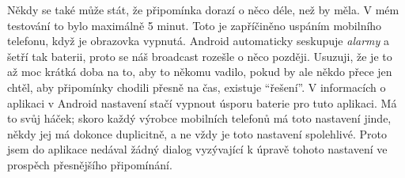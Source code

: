 \documentclass[../TakeYourPill.tex]{subfiles}
\begin{document}
Někdy se také může stát, že připomínka dorazí o něco déle, než by měla. V mém testování to bylo maximálně 5 minut. Toto je zapříčiněno uspáním mobilního telefonu, když je obrazovka vypnutá. Android automaticky seskupuje \textit{alarmy} a šetří tak baterii, proto se náš broadcast rozešle o něco později. Usuzuji, že je to až moc krátká doba na to, aby to někomu vadilo, pokud by ale někdo přece jen chtěl, aby připomínky chodili přesně na čas, existuje \enquote{řešení}. V informacích o aplikaci v Android nastavení stačí vypnout úsporu baterie pro tuto aplikaci. Má to svůj háček; skoro každý výrobce mobilních telefonů má toto nastavení jinde, někdy jej má dokonce duplicitně, a ne vždy je toto nastavení spolehlivé. Proto jsem do aplikace nedával žádný dialog vyzývající k úpravě tohoto nastavení ve prospěch přesnějšího připomínání.
\end{document}
